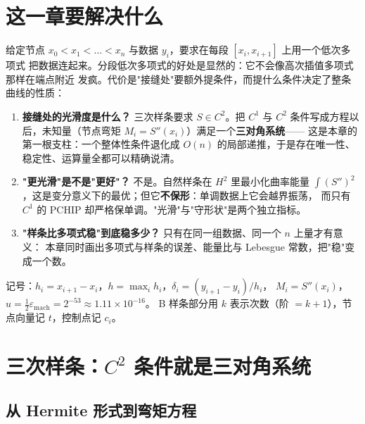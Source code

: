 

\section{这一章要解决什么}

给定节点 $x_0<x_1<\dots<x_n$ 与数据 $y_i$，要求在每段 $[x_i,x_{i+1}]$ 上用一个低次多项式
把数据连起来。分段低次多项式的好处是显然的：它不会像高次插值多项式那样在端点附近
发疯。代价是"接缝处"要额外提条件，而提什么条件决定了整条曲线的性质：

\begin{enumerate}
  \item \textbf{接缝处的光滑度是什么？} 三次样条要求 $S\in C^2$。把 $C^1$ 与 $C^2$
        条件写成方程以后，未知量（节点弯矩 $M_i=S''(x_i)$）满足一个\textbf{三对角系统}——
        这是本章的第一根支柱：一个整体性条件退化成 $O(n)$ 的局部递推，于是存在唯一性、
        稳定性、运算量全都可以精确说清。
  \item \textbf{"更光滑"是不是"更好"？} 不是。自然样条在 $H^2$ 里最小化曲率能量
        $\int(S'')^2$，这是变分意义下的最优；但它\textbf{不保形}：单调数据上它会越界振荡，
        而只有 $C^1$ 的 PCHIP 却严格保单调。"光滑"与"守形状"是两个独立指标。
  \item \textbf{"样条比多项式稳"到底稳多少？} 只有在同一组数据、同一个 $n$ 上量才有意义：
        本章同时画出多项式与样条的误差、能量比与 Lebesgue 常数，把"稳"变成一个数。
\end{enumerate}

记号：$h_i=x_{i+1}-x_i$，$h=\max_i h_i$，$\delta_i=(y_{i+1}-y_i)/h_i$，
$M_i=S''(x_i)$，$u=\tfrac12\varepsilon_{\text{mach}}=2^{-53}\approx1.11\times10^{-16}$。
B 样条部分用 $k$ 表示次数（阶 $=k+1$），节点向量记 $t$，控制点记 $c_i$。

\section{三次样条：$C^2$ 条件就是三对角系统}

\subsection{从 Hermite 形式到弯矩方程}

